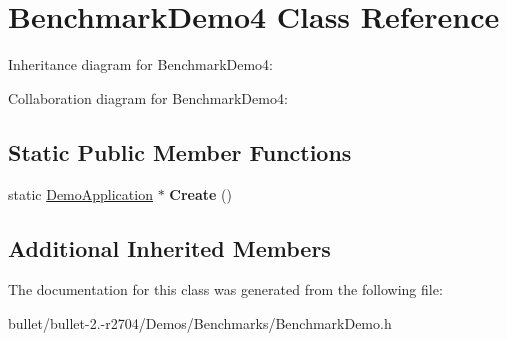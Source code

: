 \hypertarget{class_benchmark_demo4}{\section{Benchmark\+Demo4 Class Reference}
\label{class_benchmark_demo4}
}


Inheritance diagram for Benchmark\+Demo4\+:


Collaboration diagram for Benchmark\+Demo4\+:
\subsection*{Static Public Member Functions}
\begin{DoxyCompactItemize}
\item 
\hypertarget{class_benchmark_demo4_a3fe8ff5744ec061eb19c60cc006c8829}{static \hyperlink{class_demo_application}{Demo\+Application} $\ast$ {\bfseries Create} ()}\label{class_benchmark_demo4_a3fe8ff5744ec061eb19c60cc006c8829}

\end{DoxyCompactItemize}
\subsection*{Additional Inherited Members}


The documentation for this class was generated from the following file\+:\begin{DoxyCompactItemize}
\item 
bullet/bullet-\/2.-\/r2704/\+Demos/\+Benchmarks/Benchmark\+Demo.\+h\end{DoxyCompactItemize}
